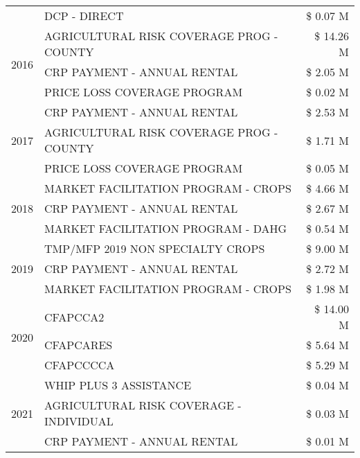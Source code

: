 \begin{tabular}{llr}
 & DCP - DIRECT & \$ 0.07 M \\
\cline{1-3}
\multirow[t]{3}{*}{2016} & AGRICULTURAL RISK COVERAGE PROG - COUNTY      & \$ 14.26 M \\
 & CRP PAYMENT - ANNUAL RENTAL                   & \$ 2.05 M \\
 & PRICE LOSS COVERAGE PROGRAM                   & \$ 0.02 M \\
\cline{1-3}
\multirow[t]{3}{*}{2017} & CRP PAYMENT - ANNUAL RENTAL & \$ 2.53 M \\
 & AGRICULTURAL RISK COVERAGE PROG - COUNTY & \$ 1.71 M \\
 & PRICE LOSS COVERAGE PROGRAM & \$ 0.05 M \\
\cline{1-3}
\multirow[t]{3}{*}{2018} & MARKET FACILITATION PROGRAM - CROPS & \$ 4.66 M \\
 & CRP PAYMENT - ANNUAL RENTAL & \$ 2.67 M \\
 & MARKET FACILITATION PROGRAM - DAHG & \$ 0.54 M \\
\cline{1-3}
\multirow[t]{3}{*}{2019} & TMP/MFP 2019 NON SPECIALTY CROPS & \$ 9.00 M \\
 & CRP PAYMENT - ANNUAL RENTAL & \$ 2.72 M \\
 & MARKET FACILITATION PROGRAM - CROPS & \$ 1.98 M \\
\cline{1-3}
\multirow[t]{3}{*}{2020} & CFAPCCA2 & \$ 14.00 M \\
 & CFAPCARES & \$ 5.64 M \\
 & CFAPCCCCA & \$ 5.29 M \\
\cline{1-3}
\multirow[t]{3}{*}{2021} & WHIP PLUS 3 ASSISTANCE & \$ 0.04 M \\
 & AGRICULTURAL RISK COVERAGE - INDIVIDUAL & \$ 0.03 M \\
 & CRP PAYMENT - ANNUAL RENTAL & \$ 0.01 M \\
\cline{1-3}
\bottomrule
\end{tabular}
